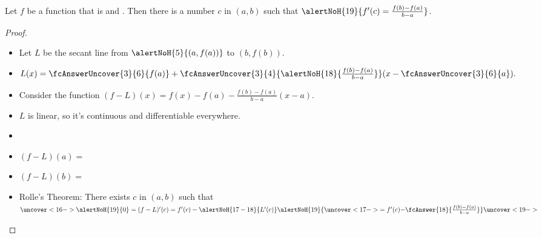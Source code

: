 \begin{frame}[t]
\begin{theorem}
Let $f$ be a function that is  and .
Then there is a number $c$ in $(a,b)$ such that $\alertNoH{19}{f'(c) = \frac{f(b)-f(a)}{b-a}}$.
\end{theorem}

\begin{proof}
\begin{itemize}
\item<2->  Let $L$ be the secant line from $\alertNoH{ 5}{(a,f(a))}$ to $(b,f(b))$.
\item<3->  $L(x) =  \fcAnswerUncover{3}{ 6}{f(a)} + \fcAnswerUncover{3}{4}{\alertNoH{ 18}{ \frac{f(b)-f(a) }{b-a}}}(x-\fcAnswerUncover{3}{6}{a}).$
\item<7->  Consider the function $(f - L)(x) = f(x) - f(a) - \frac{f(b)-f(a)}{b-a}(x-a)$.
\item<8-| alert@9-10>  $L$ is linear, so it's continuous and differentiable everywhere.
\item<9->   
\item<11-| alert@12-13>  $(f-L)(a) =$ 
\item<11-| alert@14-15>  $(f-L)(b) =$ 
\item<16->  Rolle's Theorem: There exists $c$ in $(a,b)$ such that
\abovedisplayskip=0pt
\belowdisplayskip=0pt
$
\uncover<16->{%
\alertNoH{19}{0} = (f-L)'(c) = f'(c) - \alertNoH{ 17-18}{L'(c)} } \alertNoH{19}{\uncover<17->{= f'(c) - } \fcAnswer{18}{ \frac{ f(b)-f(a)}{b-a}}}%
\uncover<19->{\qedhere} %
$
\end{itemize}
\end{proof}

\vspace{2cm} %
\end{frame}
